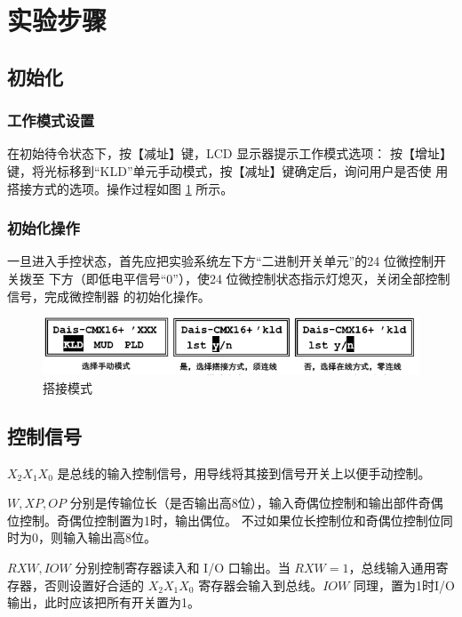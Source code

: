 \documentclass[a4paper,10pt,UTF8]{paper}
\numberwithin{equation}{section}
\numberwithin{figure}{section}
\begin{document}
\section{实验步骤}

\subsection{初始化}

\subsubsection{工作模式设置}

在初始待令状态下，按【减址】键，LCD 显示器提示工作模式选项：
按【增址】键，将光标移到“KLD”单元手动模式，按【减址】键确定后，询问用户是否使
用搭接方式的选项。操作过程如图 \ref{fig:dajie} 所示。

\subsubsection{初始化操作}

一旦进入手控状态，首先应把实验系统左下方“二进制开关单元”的24 位微控制开关拨至
下方（即低电平信号“0”），使24 位微控制状态指示灯熄灭，关闭全部控制信号，完成微控制器
的初始化操作。

\begin{figure}[h]
    \centering
    \includegraphics[width=1\textwidth]{dajiemoshi.PNG}
    \caption{搭接模式}
    \label{fig:dajie}
\end{figure}

\subsection{控制信号}

$X_2X_1X_0$ 是总线的输入控制信号，用导线将其接到信号开关上以便手动控制。

$W, XP, OP$ 分别是传输位长（是否输出高8位），输入奇偶位控制和输出部件奇偶位控制。奇偶位控制置为1时，输出偶位。
不过如果位长控制位和奇偶位控制位同时为0，则输入输出高8位。

$RXW, IOW$ 分别控制寄存器读入和 I/O 口输出。当 $RXW=1$，总线输入通用寄存器，否则设置好合适的 $X_2X_1X_0$ 寄存器会输入到总线。$IOW$ 同理，置为1时I/O输出，此时应该把所有开关置为1。
\end{document}
